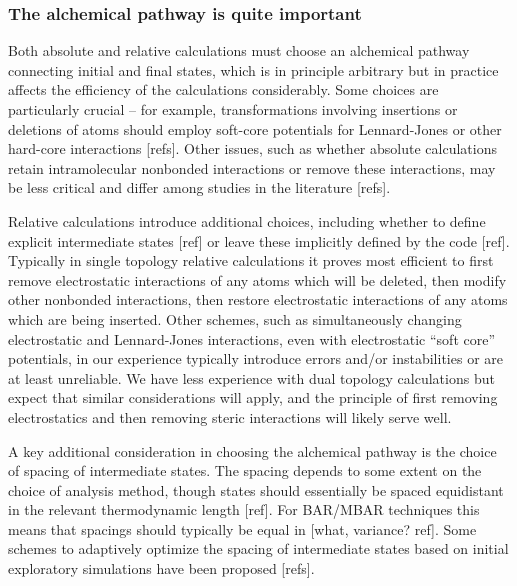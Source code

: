 \documentclass[9pt,bestpractices]{livecoms}
\begin{document}
\subsubsection{The alchemical pathway is quite important}


Both absolute and relative calculations must choose an alchemical pathway connecting initial and final states, which is in principle arbitrary but in practice affects the efficiency of the calculations considerably.
Some choices are particularly crucial -- for example, transformations involving insertions or deletions of atoms should employ soft-core potentials for Lennard-Jones or other hard-core interactions [refs].
Other issues, such as whether absolute calculations retain intramolecular nonbonded interactions or remove these interactions, may be less critical and differ among studies in the literature [refs].

Relative calculations introduce additional choices, including whether to define explicit intermediate states [ref] or leave these implicitly defined by the code [ref].
Typically in single topology relative calculations it proves most efficient to first remove electrostatic interactions of any atoms which will be deleted, then modify other nonbonded interactions, then restore electrostatic interactions of any atoms which are being inserted.
Other schemes, such as simultaneously changing electrostatic and Lennard-Jones interactions, even with electrostatic ``soft core'' potentials, in our experience typically introduce errors and/or instabilities or are at least unreliable.
We have less experience with dual topology calculations but expect that similar considerations will apply, and the principle of first removing electrostatics and then removing steric interactions will likely serve well.

A key additional consideration in choosing the alchemical pathway is the choice of spacing of intermediate states.
The spacing depends to some extent on the choice of analysis method, though states should essentially be spaced equidistant in the relevant thermodynamic length [ref].
For BAR/MBAR techniques this means that spacings should typically be equal in [what, variance? ref].
Some schemes to adaptively optimize the spacing of intermediate states based on initial exploratory simulations have been proposed [refs].
\end{document}
